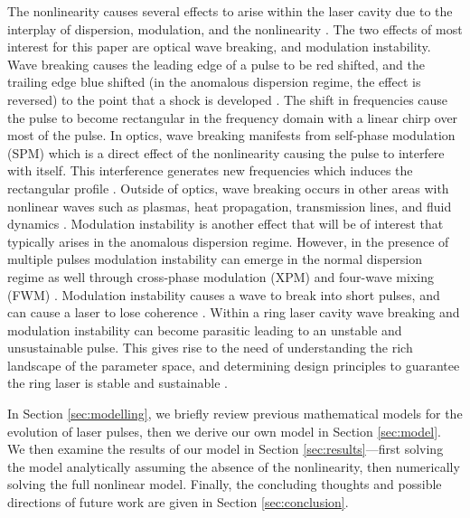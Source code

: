 \documentclass[10pt,twocolumn,a4paper]{article}
\begin{document}
The nonlinearity causes several effects to arise within the laser cavity due to the interplay of dispersion, modulation, and the nonlinearity \cite{bohun2015, coen1997, lapre2019, shao2019, woodward2018}. The two effects of most interest for this paper are optical wave breaking, and modulation instability. Wave breaking causes the leading edge of a pulse to be red shifted, and the trailing edge blue shifted (in the anomalous dispersion regime, the effect is reversed) to the point that a shock is developed \cite{anderson1992, rothenberg1989a, rothenberg1989b, tomlinson1984, tomlinson1985}. The shift in frequencies cause the pulse to become rectangular in the frequency domain with a linear chirp over most of the pulse. In optics, wave breaking manifests from self-phase modulation (SPM) which is a direct effect of the nonlinearity causing the pulse to interfere with itself. This interference generates new frequencies which induces the rectangular profile \cite{agrawal2013, mollenauer1980, woodward2018}. Outside of optics, wave breaking occurs in other areas with nonlinear waves such as plasmas, heat propagation, transmission lines, and fluid dynamics \cite{rothenberg1989b}. Modulation instability is another effect that will be of interest that typically arises in the anomalous dispersion regime. However, in the presence of multiple pulses modulation instability can emerge in the normal dispersion regime as well through cross-phase modulation (XPM) and four-wave mixing (FWM) \cite{agrawal1987, agrawal1989, agrawal2013, haelterman1992}. Modulation instability causes a wave to break into short pulses, and can cause a laser to lose coherence \cite{agrawal1987, coen1997, haelterman1992}. Within a ring laser cavity wave breaking and modulation instability can become parasitic leading to an unstable and unsustainable pulse. This gives rise to the need of understanding the rich landscape of the parameter space, and determining design principles to guarantee the ring laser is stable and sustainable \cite{bohun2015, burgoyneemail, finot2008, lapre2019, woodward2018}.

In Section \ref{sec:modelling}, we briefly review previous mathematical models for the evolution of laser pulses, then we derive our own model in Section \ref{sec:model}. We then examine the results of our model in Section \ref{sec:results}---first solving the model analytically assuming the absence of the nonlinearity, then numerically solving the full nonlinear model. Finally, the concluding thoughts and possible directions of future work are given in Section \ref{sec:conclusion}.
\end{document}
